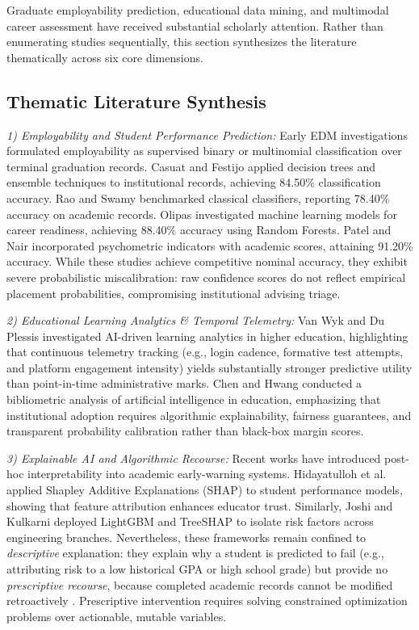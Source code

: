 \documentclass[conference]{IEEEtran}
\begin{document}
Graduate employability prediction, educational data mining, and multimodal career assessment have received substantial scholarly attention. Rather than enumerating studies sequentially, this section synthesizes the literature thematically across six core dimensions.

\subsection{Thematic Literature Synthesis}

\textit{1) Employability and Student Performance Prediction:}
Early EDM investigations formulated employability as supervised binary or multinomial classification over terminal graduation records. Casuat and Festijo \cite{b7} applied decision trees and ensemble techniques to institutional records, achieving 84.50\% classification accuracy. Rao and Swamy \cite{b8} benchmarked classical classifiers, reporting 78.40\% accuracy on academic records. Olipas \cite{b1} investigated machine learning models for career readiness, achieving 88.40\% accuracy using Random Forests. Patel and Nair \cite{b4} incorporated psychometric indicators with academic scores, attaining 91.20\% accuracy. While these studies achieve competitive nominal accuracy, they exhibit severe probabilistic miscalibration: raw confidence scores do not reflect empirical placement probabilities, compromising institutional advising triage.

\textit{2) Educational Learning Analytics \& Temporal Telemetry:}
Van Wyk and Du Plessis \cite{b2} investigated AI-driven learning analytics in higher education, highlighting that continuous telemetry tracking (e.g., login cadence, formative test attempts, and platform engagement intensity) yields substantially stronger predictive utility than point-in-time administrative marks. Chen and Hwang \cite{b5} conducted a bibliometric analysis of artificial intelligence in education, emphasizing that institutional adoption requires algorithmic explainability, fairness guarantees, and transparent probability calibration rather than black-box margin scores.

\textit{3) Explainable AI and Algorithmic Recourse:}
Recent works have introduced post-hoc interpretability into academic early-warning systems. Hidayatulloh et al. \cite{b16} applied Shapley Additive Explanations (SHAP) to student performance models, showing that feature attribution enhances educator trust. Similarly, Joshi and Kulkarni \cite{b17} deployed LightGBM and TreeSHAP to isolate risk factors across engineering branches. Nevertheless, these frameworks remain confined to \textit{descriptive} explanation: they explain why a student is predicted to fail (e.g., attributing risk to a low historical GPA or high school grade) but provide no \textit{prescriptive recourse}, because completed academic records cannot be modified retroactively \cite{b16,b17}. Prescriptive intervention requires solving constrained optimization problems over actionable, mutable variables.
\end{document}
